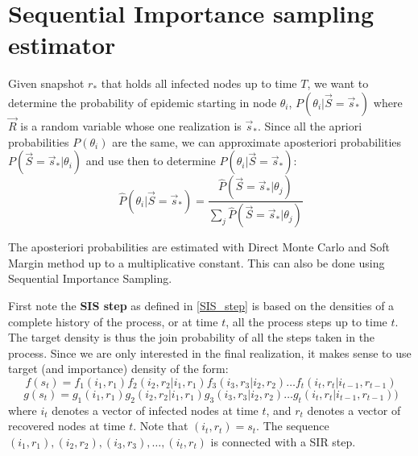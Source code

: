 \documentclass[times, utf8, diplomski]{fer}
\begin{document}
\section{Sequential Importance sampling estimator}
Given snapshot $r_*$ that holds all infected nodes up to time $T$, we want to determine the probability  of epidemic starting in node $\theta_i$, $P(\theta_i | \vec S = \vec s_*)$ where $\vec R$ is a random variable whose one realization is $\vec s_*$.   Since all the apriori probabilities $P(\theta_i)$ are the same, we can approximate aposteriori probabilities $P(\vec S = \vec s_* | \theta_i)$ and use then to determine $P(\theta_i | \vec S = \vec s_*)$:
\begin{equation*}
\hat{P}(\theta_i | \vec S = \vec s_*) = \frac{\hat{P}(\vec S = \vec s_* | \theta_j)}{\sum_j \hat{P}(\vec S = \vec s_* | \theta_j)}
\end{equation*}

The aposteriori probabilities are estimated with Direct Monte Carlo and Soft Margin method up to a multiplicative constant. This can also be done using Sequential Importance Sampling.

First note the \textbf{SIS step} as defined in \ref{SIS_step} is based on the densities of a complete history of the process, or at time $t$, all the process steps up to time $t$. The target density is thus the join probability of all the steps taken in the process. Since we are only interested  in the final realization, it makes sense to use target (and importance) density of the form:
\begin{equation*}
f(s_t) = f_1(i_1, r_1) f_2(i_2, r_2 | i_1, r_1)  f_3(i_3, r_3 | i_2, r_2)  \ldots  f_t(i_t, r_t | i_{t - 1}, r_{t - 1})
\end{equation*}
\begin{equation*}
g(s_t) = g_1(i_1, r_1) g_2(i_2, r_2 | i_1, r_1) g_3(i_3, r_3 | i_2, r_2) \ldots  g_t(i_t, r_t | i_{t - 1}, r_{t - 1}))
\end{equation*}
where $i_t$ denotes a vector of infected nodes at time $t$, and $r_t$ denotes a vector of recovered nodes at time $t$. Note that $(i_t, r_t) = s_t$. The sequence $(i_1, r_1), (i_2, r_2), (i_3, r_3), \ldots, (i_t, r_t)$ is connected with a SIR step.
\end{document}
